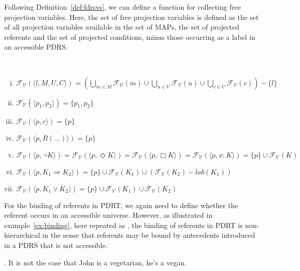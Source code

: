 \noindent Following Definition~\ref{def:fdrsvs}, we can define a function
for collecting free projection variables. Here, the set of free projection
variables is defined as the set of all projection variables available in the
set of MAPs, the set of projected referents and the set of projected
conditions, minus those occurring as a label in an accessible PDRS.

\begin{definition}\label{def:fpvs}~
  \begin{enumerate}[i.]
    \item $\mathcal{F_V}(\langle l, M, U, C \rangle) 
          = (\bigcup_{m\in M} \mathcal{F_V}(m)
            \cup \bigcup_{u\in U} \mathcal{F_V}(u) 
            \cup \bigcup_{c\in C} \mathcal{F_V}(c)) - \{l\}$
    \item $\mathcal{F_V}(\langle p_1, p_2\rangle) = \{p_1, p_2\}$
    \item $\mathcal{F_V}(\langle p, r\rangle) = \{p\}$
    \item $\mathcal{F_V}(\langle p, R(...)\rangle) = \{p\}$
    \item $\mathcal{F_V}(\langle p,\neg K\rangle)
          = \mathcal{F_V}(\langle p,\Diamond K\rangle)
          = \mathcal{F_V}(\langle p,\Box K\rangle)
          = \mathcal{F_V}(\langle p,x:K\rangle) 
          = \{p\} \cup \mathcal{F_V}(K)$
    \item $\mathcal{F_V}(\langle p,K_1 \Rightarrow K_2\rangle) 
          = \{p\}\cup \mathcal{F_V}(K_1)
            \cup (\mathcal{F_V}(K_2) - lab(K_1))$
    \item $\mathcal{F_V}(\langle p,K_1 \vee K_2\rangle) 
          = \{p\}\cup \mathcal{F_V}(K_1) \cup \mathcal{F_V}(K_2)$
  \end{enumerate}
\end{definition}

For the binding of referents in PDRT, we again need to define whether the
referent occurs in an accessible universe.  However, as illustrated in
example~\ref{ex:binding}, here repeated as \Next, the binding of referents
in PDRT is non-hierarchical in the sense that referents may be bound by
antecedents introduced in a PDRS that is not accessible.

\ex. It is not the case that John is a vegetarian, he's a vegan.\\
\label{ex:binding_rep}

